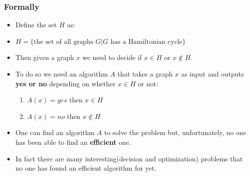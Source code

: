 \documentclass{beamer}
\begin{document}
\begin{frame}[fragile]
\frametitle{Formally}
\begin{itemize}
 \item Define the set $H$ as:
  \item $H=\{\text{the set of all graphs } G | G\text{ has a Hamiltonian cycle}\}$
  \item Then given a graph $x$ we need to decide if $x\in H$ or $x\notin H$.
  \item To do so we need an algorithm $A$ that takes a graph $x$ as input and outputs \textbf{yes or no} depending on whether $x\in H$ or not:
    \begin{enumerate}
    \item $A(x)=yes$ then $x\in H$
    \item $A(x)=no$ then $x\notin H$
    \end{enumerate}
\item One can find an algorithm $A$ to solve the problem but, unfortunately, no one has been able to find an \textbf{efficient} one.
\item In fact there are many interesting(decision and optimization) problems that no one has found an efficient algorithm for yet.
  \end{itemize}

\end{frame}
\end{document}
